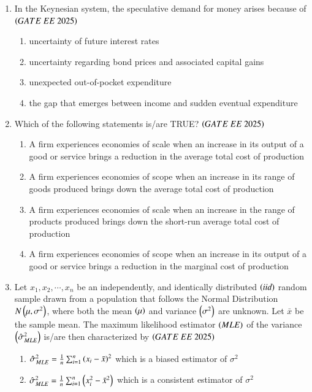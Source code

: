 \documentclass[journal,12pt,onecolumn]{IEEEtran}
\theoremstyle{remark}
\begin{document}
\begin{enumerate}
\item In the Keynesian system, the speculative demand for money arises because of
\hfill $\brak{GATE\ EE\ 2025}$
    \begin{enumerate}
    \item uncertainty of future interest rates
    \item uncertainty regarding bond prices and associated capital gains
    \item unexpected out-of-pocket expenditure
    \item the gap that emerges between income and sudden eventual expenditure
   \end{enumerate}
\item Which of the following statements is/are TRUE?
\hfill $\brak{GATE\ EE\ 2025}$
    \begin{enumerate}
     \item A firm experiences economies of scale when an increase in its output of a good or service brings a reduction in the average total cost of production
    \item A firm experiences economies of scope when an increase in its range of goods produced brings down the average total cost of production
    \item A firm experiences economies of scale when an increase in the range of products produced brings down the short-run average total cost of production
    \item A firm experiences economies of scope when an increase in its output of a good or service brings a reduction in the marginal cost of production
   \end{enumerate}
    \item Let $x_1, x_2, \cdots, x_n$ be an independently, and identically distributed  $\left(\textit{iid}\right)$ random sample drawn from a population that follows the Normal Distribution $N \left(\mu, \sigma^2\right)$, where both the mean $\left(\mu\right)$ and variance $ \left(\sigma^2\right)$ are unknown. Let $\bar{x}$ be the sample mean. The maximum likelihood estimator  $\left(MLE\right)$ of the variance $\left(\hat{\sigma}^2_{MLE}\right)$ is/are then characterized by
    \hfill $\brak{GATE\ EE\ 2025}$
    \begin{enumerate}
    \item $\hat{\sigma}_{MLE}^2 = \frac{1}{n}\sum_{i=1}^{n} \left(x_i-\bar{x}\right)^2$ which is a biased estimator of $\sigma^2$
    \item $\hat{\sigma}_{MLE}^2 = \frac{1}{n}\sum_{i=1}^{n} \left(x_i^2-\bar{x}^2\right)$ which is a consistent estimator of $\sigma^2$

\end{enumerate}
\end{enumerate}
\end{document}
